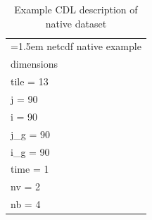 \begin{longtable}{|p{\textwidth}|}
\caption{Example CDL description of native dataset}
\label{tab:cdl-native} \\
\hline \endhead
\hline \endfoot
\hangindent=1.5em\hangafter=1
netcdf native example\\
dimensions\\
\hline
\rowcolor{YellowGreen}  tile = 13\\
\rowcolor{YellowGreen}  j = 90\\
\rowcolor{YellowGreen}  i = 90\\
\rowcolor{YellowGreen}  j\_g = 90\\
\rowcolor{YellowGreen}  i\_g = 90\\
\rowcolor{YellowGreen}  time = 1\\
\rowcolor{YellowGreen}  nv = 2\\
\rowcolor{YellowGreen}  nb = 4\\
\hline


\end{longtable}
